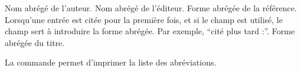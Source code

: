 \begin{fieldlist}
     Nom abrégé de l'auteur.
     Nom abrégé de l'éditeur.
     Forme abrégée de la référence.
     Lorsqu'une entrée est citée pour la première fois, et si le champ  est utilisé, le champ  sert à introduire la forme abrégée. Par exemple, \enquote{cité plus tard :}.
     Forme abrégée du titre.
\end{fieldlist}

La commande  permet d'imprimer la liste des abréviations.

\bibverbosetrad
